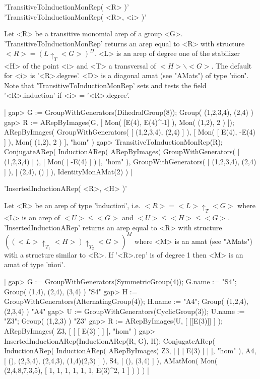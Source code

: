 
'TransitiveToInductionMonRep( <R> )'\\
'TransitiveToInductionMonRep( <R>, <i> )'

Let <R> be a transitive monomial arep of a group <G>.
'TransitiveToInductionMonRep' returns an arep equal to <R> 
with structure $<R> = (L\uparrow_T <G>)^D$. 
<L> is an arep of degree one of 
the stabilizer <H> of the point <i> and <T> a transversal 
of $<H>\backslash <G>$. The default for <i> is '<R>.degree'.
<D> is a diagonal amat (see "AMats") of type '\"mon\"'. 
Note that 'TransitiveToInductionMonRep' sets and tests the
field '<R>.induction' if <i> = '<R>.degree'.

|    gap> G := GroupWithGenerators(DihedralGroup(8));
    Group( (1,2,3,4), (2,4) )
    gap> R := ARepByImages(G, [ Mon( [E(4), E(4)^-1] ), Mon( (1,2), 2 ) ]);
    ARepByImages(
      GroupWithGenerators( [ (1,2,3,4), (2,4) ] ),
      [ Mon( [ E(4), -E(4) ] ), Mon( (1,2), 2 ) ],
      "hom"
    )
    gap> TransitiveToInductionMonRep(R);
    ConjugateARep(
      InductionARep(
        ARepByImages(
          GroupWithGenerators( [ (1,2,3,4) ] ),
          [ Mon( [ -E(4) ] ) ],
          "hom"
        ),
        GroupWithGenerators( [ (1,2,3,4), (2,4) ] ),
        [ (2,4), () ]
      ),
      IdentityMonAMat(2)
    ) |


'InsertedInductionARep( <R>, <H> )'

Let <R> be an arep of type '\"induction\"', i.e.
$<R> = <L>\uparrow_T <G>$ where <L> is an arep of $<U> \leq <G>$
and $<U> \leq <H> \leq <G>$.
'InsertedInductionARep' returns an arep equal to <R>
with structure $\left( (<L>\uparrow_{T_1}<H>)\uparrow_{T_2}<G>\right)^M$
where <M> is an amat (see "AMats") with a structure similar to <R>. 
If '<R>.rep' is of degree 1 then <M> is an amat of type '\"mon\"'.

|    gap> G := GroupWithGenerators(SymmetricGroup(4)); G.name := "S4";
    Group( (1,4), (2,4), (3,4) )
    "S4"
    gap> H := GroupWithGenerators(AlternatingGroup(4)); H.name := "A4";
    Group( (1,2,4), (2,3,4) )
    "A4"
    gap> U := GroupWithGenerators(CyclicGroup(3)); U.name := "Z3";
    Group( (1,2,3) )
    "Z3"
    gap> R := ARepByImages(U, [ [[E(3)]] ] );
    ARepByImages(
      Z3,
      [ [ [ E(3) ] ]
      ],
      "hom"
    )
    gap> InsertedInductionARep(InductionARep(R, G), H);
    ConjugateARep(
      InductionARep(
        InductionARep(
          ARepByImages(
            Z3,
            [ [ [ E(3) ] ] ],
            "hom"
          ),
          A4,
          [ (), (2,3,4), (2,4,3), (1,4)(2,3) ]
        ),
        S4,
        [ (), (3,4) ]
      ),
      AMatMon( Mon(
        (2,4,8,7,3,5),
        [ 1, 1, 1, 1, 1, 1, E(3)^2, 1 ]
      ) )
    ) |

